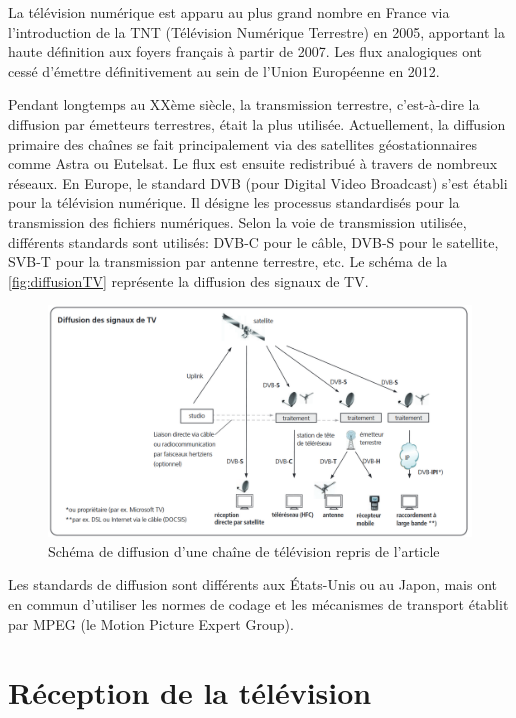 \documentclass{polytech/polytech}
\begin{document}
La télévision numérique est apparu au plus grand nombre en France via l'introduction de la TNT (Télévision Numérique Terrestre) en 2005, apportant la haute définition aux foyers français à partir de 2007. Les flux analogiques ont cessé d'émettre définitivement au sein de l'Union Européenne en 2012.


Pendant longtemps au XXème siècle, la transmission terrestre, c'est-à-dire la diffusion par émetteurs terrestres, était la plus utilisée. Actuellement, la diffusion primaire des chaînes se fait principalement via des satellites géostationnaires comme Astra ou Eutelsat. Le flux est ensuite redistribué à travers de nombreux réseaux. En Europe, le standard DVB (pour Digital Video Broadcast) s'est établi pour la télévision numérique. Il désigne les processus standardisés pour la transmission des fichiers numériques. Selon la voie de transmission utilisée, différents standards sont utilisés: DVB-C pour le câble, DVB-S pour le satellite, SVB-T pour la transmission par antenne terrestre, etc. Le schéma de la \autoref{fig:diffusionTV} représente la diffusion des signaux de TV.

\begin{figure}
	\includegraphics[scale=0.5]{images/diffusionTV.png}
	\caption{Schéma de diffusion d'une chaîne de télévision repris de l'article \cite{_diffusion_2018}}
	\label{fig:diffusionTV}
\end{figure}

Les standards de diffusion sont différents aux \'{E}tats-Unis ou au Japon, mais ont en commun d'utiliser les normes de codage et les mécanismes de transport établit par MPEG (le Motion Picture Expert Group). 


\section{Réception de la télévision}
\end{document}
